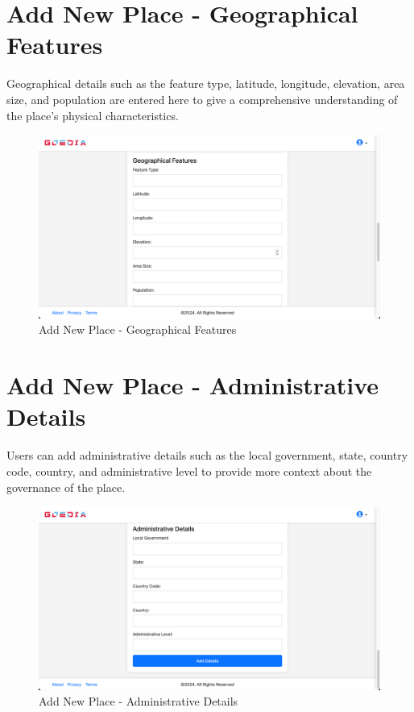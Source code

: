 \section{Add New Place - Geographical Features}
Geographical details such as the feature type, latitude, longitude, elevation, area size, and population are entered here to give a comprehensive understanding of the place's physical characteristics.

\begin{figure}[H]
    \centering
    \includegraphics[width=\textwidth]{addnewPlaceGeo.png}
    \caption{Add New Place - Geographical Features}
    \label{fig:addnewPlaceGeo}
\end{figure}

\section{Add New Place - Administrative Details}
Users can add administrative details such as the local government, state, country code, country, and administrative level to provide more context about the governance of the place.

\begin{figure}[H]
    \centering
    \includegraphics[width=\textwidth]{addNewPlaceAdmDetails.png}
    \caption{Add New Place - Administrative Details}
    \label{fig:addNewPlaceAdmDetails}
\end{figure}

